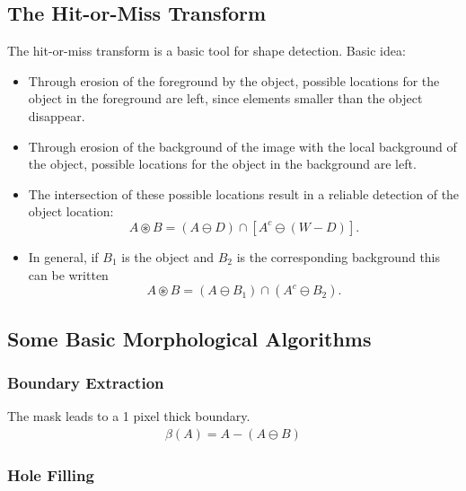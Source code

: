 \subsection{The Hit-or-Miss Transform}

The hit-or-miss transform is a basic tool for shape detection. Basic idea:
\begin{itemize}
	\item Through erosion of the foreground by the object, possible locations for the object in the foreground are left, since elements smaller than the object disappear.

	\item Through erosion of the background of the image with the local background of the object, possible locations for the object in the background are left.

	\item The intersection of these possible locations result in a reliable  detection of the object location:
	\[
		A \circledast B = (A \ominus D) \cap [ A^c \ominus (W-D)].
	\]

	\item In general, if \(B_1\) is the object and \(B_2\) is the corresponding background this can be written
	\[
		A \circledast B = (A \ominus B_1)\cap (A^c \ominus B_2).
	\]
\end{itemize}

\subsection{Some Basic Morphological Algorithms}

\subsubsection{Boundary Extraction}

\begin{multicols}{2}
	\begin{center}
	\end{center}
	\columnbreak
	The mask leads to a 1 pixel thick boundary.
	\begin{align*}
		\beta(A) = A - (A\ominus B)
	\end{align*}
\end{multicols}

\subsubsection{Hole Filling}

